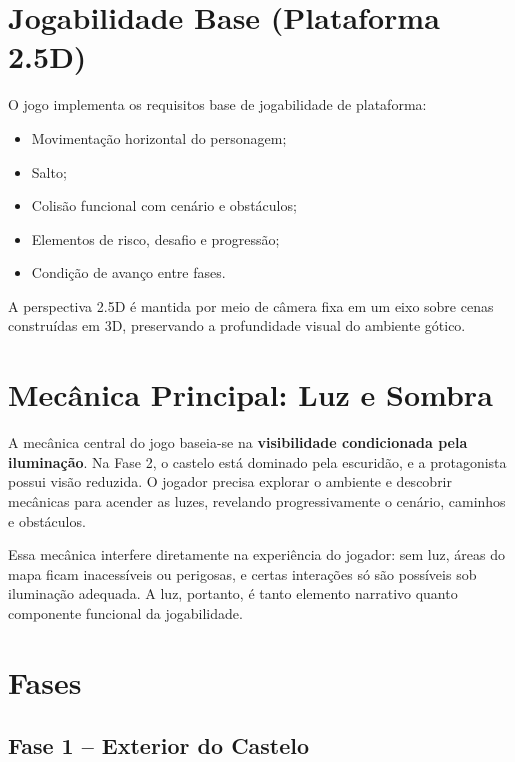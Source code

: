 \documentclass[10pt,conference]{IEEEtran}
\begin{document}
\section{Jogabilidade Base (Plataforma 2.5D)}

O jogo implementa os requisitos base de jogabilidade de plataforma:

\begin{itemize}
    \item Movimentação horizontal do personagem;
    \item Salto;
    \item Colisão funcional com cenário e obstáculos;
    \item Elementos de risco, desafio e progressão;
    \item Condição de avanço entre fases.
\end{itemize}

A perspectiva 2.5D é mantida por meio de câmera fixa em um eixo sobre cenas construídas em 3D, preservando a profundidade visual do ambiente gótico.

\section{Mecânica Principal: Luz e Sombra}

A mecânica central do jogo baseia-se na \textbf{visibilidade condicionada pela iluminação}. Na Fase 2, o castelo está dominado pela escuridão, e a protagonista possui visão reduzida. O jogador precisa explorar o ambiente e descobrir mecânicas para acender as luzes, revelando progressivamente o cenário, caminhos e obstáculos.

Essa mecânica interfere diretamente na experiência do jogador: sem luz, áreas do mapa ficam inacessíveis ou perigosas, e certas interações só são possíveis sob iluminação adequada. A luz, portanto, é tanto elemento narrativo quanto componente funcional da jogabilidade.

\section{Fases}

\subsection{Fase 1 -- Exterior do Castelo}
\end{document}
